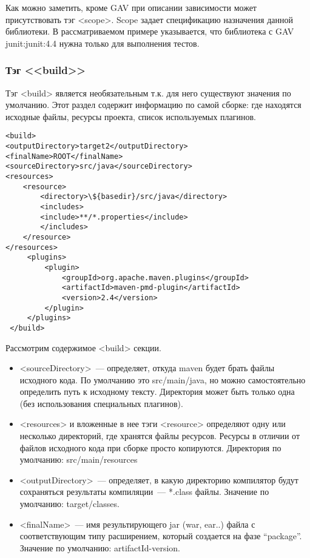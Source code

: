 Как можно заметить, кроме GAV при описании зависимости может присутствовать тэг <scope>. Scope задает спецификацию назначения данной библиотеки. В рассматриваемом примере указывается, что библиотека с GAV junit:junit:4.4 нужна только для выполнения тестов.

\subsubsection{Тэг <<build>>}
Тэг <build> является необязательным т.к. для него существуют значения по умолчанию. Этот раздел содержит информацию по самой сборке: где находятся исходные файлы, ресурсы проекта, список используемых плагинов.

\begin{lstlisting}
<build>
<outputDirectory>target2</outputDirectory>
<finalName>ROOT</finalName>
<sourceDirectory>src/java</sourceDirectory>
<resources>
    <resource>
        <directory>\${basedir}/src/java</directory>
        <includes>
        <include>**/*.properties</include>
        </includes>
    </resource>
</resources>
     <plugins>
         <plugin>
             <groupId>org.apache.maven.plugins</groupId>
             <artifactId>maven-pmd-plugin</artifactId>
             <version>2.4</version>
         </plugin>
     </plugins>
 </build>
\end{lstlisting}

Рассмотрим содержимое <build> секции.

\begin{itemize}
\item <sourceDirectory>~--- определяет, откуда maven будет брать файлы исходного кода. По умолчанию это src/main/java, но можно самостоятельно определить путь к исходному тексту. Директория может быть только одна (без использования специальных плагинов).
\item <resources> и вложенные в нее тэги <resource> определяют одну или несколько директорий, где хранятся файлы ресурсов. Ресурсы в отличии от файлов исходного кода при сборке просто копируются. Директория по умолчанию: src/main/resources 
\item <outputDirectory>~--- определяет, в какую директорию компилятор будут сохраняться результаты компиляции~--- *.class файлы. Значение по умолчанию: target/classes.
\item <finalName>~--- имя результирующего jar (war, ear..) файла с соответствующим типу расширением, который создается на фазе “package”. Значение по умолчанию: artifactId-version.
\end{itemize}

